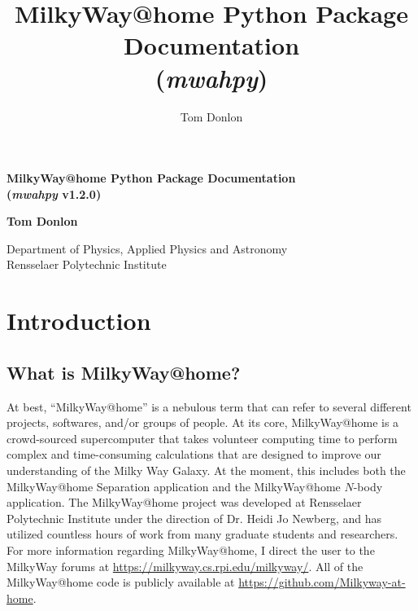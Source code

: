 \documentclass{article}
\author{Tom Donlon}
\title{MilkyWay@home Python Package Documentation \\ (\textit{mwahpy})}
\date{}
\begin{document}
\newcommand{\mwahpy}[0]{\textit{mwahpy }}
\newcommand{\msol}{$M_\odot$}

\begin{titlepage}
   \begin{center}
       \vspace*{5cm}

       \huge\textbf{MilkyWay@home Python Package Documentation \\ (\textit{mwahpy} v1.2.0)}

       \vspace{0.5cm}
        
            
       \vspace{1.5cm}

       \large\textbf{Tom Donlon}
            
       \vspace{0.8cm}
            
       Department of Physics, Applied Physics and Astronomy\\
       Rensselaer Polytechnic Institute
            
   \end{center}
\end{titlepage}

\newpage

\tableofcontents

\newpage

\section{Introduction}

\subsection{What is MilkyWay@home?}

At best, ``MilkyWay@home'' is a nebulous term that can refer to several different projects, softwares, and/or groups of people. At its core, MilkyWay@home is a crowd-sourced supercomputer that takes volunteer computing time to perform complex and time-consuming calculations that are designed to improve our understanding of the Milky Way Galaxy. At the moment, this includes both the MilkyWay@home Separation application and the MilkyWay@home $N$-body application. The MilkyWay@home project was developed at Rensselaer Polytechnic Institute under the direction of Dr. Heidi Jo Newberg, and has utilized countless hours of work from many graduate students and researchers. For more information regarding MilkyWay@home, I direct the user to the MilkyWay forums at \url{https://milkyway.cs.rpi.edu/milkyway/}. All of the MilkyWay@home code is publicly available at \url{https://github.com/Milkyway-at-home}. 
\end{document}
